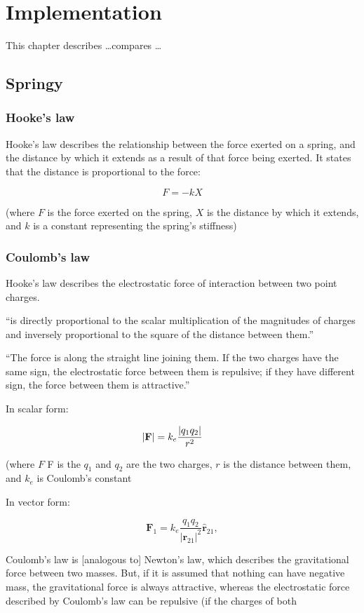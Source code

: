 \chapter{Implementation}

This chapter describes \ldots compares \ldots

\section{Springy}

\subsection{Hooke's law}

Hooke's law describes the relationship between the force exerted on a spring, and the distance by which it extends as a result of that force being exerted.
It states that the distance is proportional to the force:

$$
F = -kX
$$

(where $F$ is the force exerted on the spring, $X$ is the distance by which it extends, and $k$ is a constant representing the spring's stiffness)

\subsection{Coulomb's law}

Hooke's law describes the electrostatic force of interaction between two point charges.

``is directly proportional to the scalar multiplication of the magnitudes of charges and inversely proportional to the square of the distance between them.''

``The force is along the straight line joining them. If the two charges have the same sign, the electrostatic force between them is repulsive; if they have different sign, the force between them is attractive.'' 

In scalar form:

$$
|\mathbf F|=k_e{|q_1q_2|\over r^2}\qquad
$$

(where $F$ F is the $q_1$ and $q_2$ are the two charges, $r$ is the distance between them, and $k_e$ is Coulomb's constant 

In vector form:

$$
\qquad\mathbf F_1=k_e\frac{q_1q_2}{{|\mathbf r_{21}|}^2} \mathbf{\hat{r}}_{21},\qquad
$$


Coulomb's law is [analogous to] Newton's law, which describes the gravitational force between two masses.
But, if it is assumed that nothing can have negative mass, the gravitational force is always attractive, whereas the electrostatic force described by Coulomb's law can be repulsive (if the charges of both 

